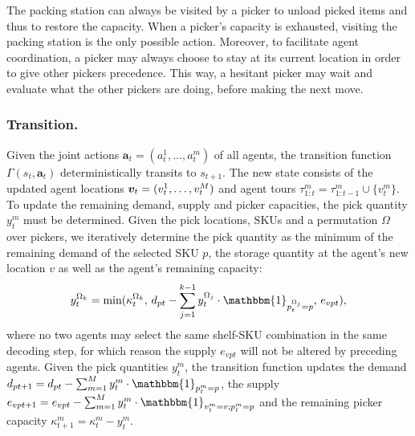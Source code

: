 The packing station can always be visited by a picker to unload picked items and thus to restore the capacity. When a picker's capacity is exhausted, visiting the packing station is the only possible action. Moreover, to facilitate agent coordination, a picker may always choose to stay at its current location in order to give other pickers precedence. This way, a hesitant picker may wait and evaluate what the other pickers are doing, before making the next move. 
\vspace{-4.5mm}
\subsubsection{Transition.} 
Given the joint actions $\bm{a}_t = (a_t^1,\ldots,a_t^m)$ of all agents, the transition function $\Gamma(s_t, \bm{a}_t)$  deterministically transits to $s_{t+1}$. The new state consists of the updated agent locations $\bm{v}_{t} = (v^1_{t}, \ldots, v^{M}_{t})$ and agent tours $\tau^m_{1:t} = \tau^m_{1:t-1} \cup{\{ v^m_{t} \}}$.
To update the remaining demand, supply and picker capacities, the pick quantity $y_t^m$ must be determined. Given the pick locations, SKUs and a permutation $\Omega$ over pickers, we iteratively determine the pick quantity as the minimum of the remaining demand of the selected SKU $p$, the storage quantity at the agent's new location $v$ as well as the agent's remaining capacity:
%
\begin{align}
    y^\curragent{k}_t = \text{min} (\kappa_t^\curragent{k}, \, d_{pt} - \sum_{j=1}^{k-1} y_t^\curragent{j} \cdot \mathbbm{1}_{p^{\curragent{j}}_t = p}, \, e_{vpt} ),
\end{align}
%
where no two agents may select the same shelf-SKU combination in the same decoding step, for which reason the supply $e_{vpt}$ will not be altered by preceding agents. 
Given the pick quantities $y_t^m$, the transition function updates the demand $d_{pt+1} = d_{pt} - \sum_{m=1}^\numagents y^m_{t} \cdot \mathbbm{1}_{p^m_t = p}$, the supply $e_{vpt+1} = e_{vpt} - \sum_{m=1}^\numagents y^m_{t} \cdot \mathbbm{1}_{v^m_{t} = v; p^m_t = p}$ and the remaining picker capacity $\kappa^m_{t+1} = \kappa^m_{t} - y^m_{t}$. 
